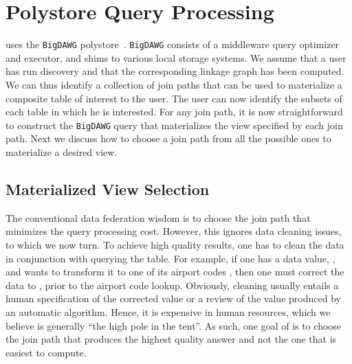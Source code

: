 \section{Polystore Query Processing}
\label{sec:curating}

\dcv uses the \texttt{BigDAWG} polystore~\cite{DBLP:journals/pvldb/ElmoreDSBCGHHKK15}. \texttt{BigDAWG} consists of a middleware query optimizer and executor, and shims to various local storage systems. We assume that a user has run discovery and that the corresponding linkage graph has been computed. We can thus identify a collection of join paths that can be used to materialize a composite table of interest to the user. The user can now identify the subsets of each table in which he is interested. For any join path, it is now straightforward to construct the \texttt{BigDAWG} query that materializes the view specified by each join path. Next we discuss how to choose a join path from all the possible ones to materialize a desired view.
	



\subsection{Materialized View Selection}

The conventional data federation wisdom is to choose the join path that minimizes the query processing cost. However, this ignores data cleaning issues, to which we now turn. To achieve high quality results, one has to clean the data in conjunction with querying the table. For example, if one has a data value, , and wants to transform it to one of its airport codes , then one must correct the data to , prior to the airport code lookup. Obviously, cleaning usually entails a human specification of the corrected value or a review of the value produced by an automatic algorithm. Hence, it is expensive in human resources, which we believe is generally ``the high pole in the tent''. 
As such, one goal of \dcv is to choose the join path that produces the highest quality answer and not the one that is easiest to compute. 

